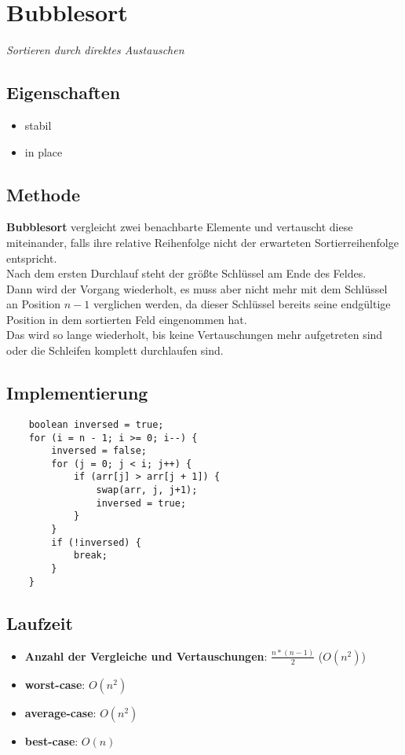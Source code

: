 \section{Bubblesort}

\textit{Sortieren durch direktes Austauschen}

\subsection{Eigenschaften}
\begin{itemize}
    \item stabil
    \item in place
\end{itemize}

\subsection{Methode}
\textbf{Bubblesort} vergleicht zwei benachbarte Elemente und vertauscht diese miteinander, falls ihre relative Reihenfolge nicht der erwarteten Sortierreihenfolge entspricht.\\
Nach dem ersten Durchlauf steht der größte  Schlüssel am Ende des Feldes.\\
Dann wird der Vorgang wiederholt, es muss aber nicht mehr mit dem Schlüssel an Position $n-1$ verglichen werden, da dieser Schlüssel bereits seine endgültige Position in dem sortierten Feld eingenommen hat.\\
Das wird so lange wiederholt, bis keine Vertauschungen mehr aufgetreten sind oder die Schleifen komplett durchlaufen sind.


\subsection{Implementierung}
\begin{verbatim}
    boolean inversed = true;
    for (i = n - 1; i >= 0; i--) {
        inversed = false;
        for (j = 0; j < i; j++) {
            if (arr[j] > arr[j + 1]) {
                swap(arr, j, j+1);
                inversed = true;
            }
        }
        if (!inversed) {
            break;
        }
    }
\end{verbatim}


\subsection{Laufzeit}
\begin{itemize}
    \item \textbf{Anzahl der Vergleiche und Vertauschungen}: $\frac{n * ( n - 1)}{2}$ ($O(n^2)$)
    \item \textbf{worst-case}: $O(n^2)$
    \item \textbf{average-case}: $O(n^2)$
    \item \textbf{best-case}: $O(n)$
\end{itemize}
